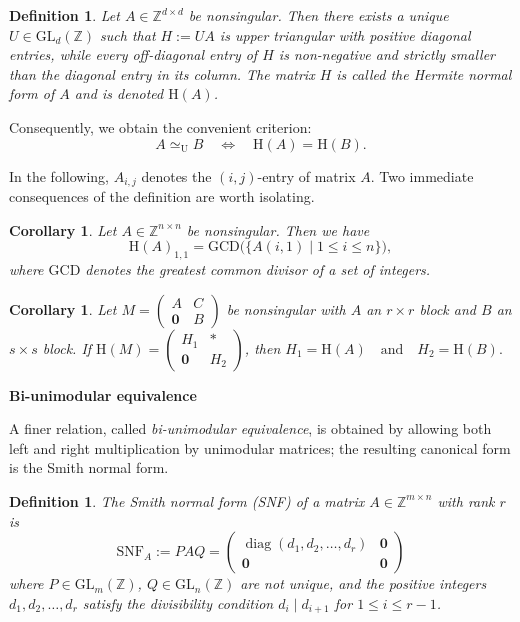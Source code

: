 \documentclass[reqno, 12pt]{article}
\newtheorem{cor}[thm]{Corollary}
\theoremstyle{mydefinition}
\newtheorem{dfn}[thm]{Definition}
\theoremstyle{myremark}
\numberwithin{algorithm}{section}
\def\Z{\mathbb{Z}}
\newcommand{\h}{{\mathrm{H}}}
\begin{document}
\begin{dfn}
Let $A\in \Z^{d \times d}$ be nonsingular.  Then there exists a unique $U \in\mathrm{GL}_d(\Z)$ such that $H:=UA$ is upper triangular with positive diagonal entries, while every off-diagonal entry of $H$ is non-negative and strictly smaller than the diagonal entry in its column.  The matrix $H$ is called the \emph{Hermite normal form} of $A$ and is denoted $\h(A)$.
\end{dfn}

Consequently, we obtain the convenient criterion:
\[
A \simeq_{\mathrm{U}} B \quad\iff\quad \h(A)=\h(B).
\]



In the following,  \( A_{i,j} \) denotes the \((i,j)\)-entry of matrix \( A \). Two immediate consequences of the definition are worth isolating.

\begin{cor}\label{cor-first-col-gcd}
Let $A\in\Z^{n\times n}$ be nonsingular.  Then we have
$$
\h(A)_{1,1} = \mathrm{GCD}\bigl( \{ A(i,1) \mid 1 \le i \le n \} \bigr),
$$
where $\mathrm{GCD}$ denotes the greatest common divisor of a set of integers.
\end{cor}

\begin{cor}\label{cor-block-HNF}
Let $M = \begin{pmatrix} A & C \\ \mathbf{0} & B \end{pmatrix}$ be nonsingular with $A$ an $r\times r$ block and $B$ an $s\times s$ block.  If $\h(M) = \begin{pmatrix} H_1 & * \\ \mathbf{0} & H_2 \end{pmatrix}$, then
$
H_1 = \h(A) \quad\text{and}\quad H_2 = \h(B).
$
\end{cor}

\def\diag{\mathop{\mathrm{diag}}}

\medskip
\noindent\textbf{Bi-unimodular equivalence}

A finer relation, called \emph{bi-unimodular equivalence}, is obtained by allowing both left and right multiplication by unimodular matrices; the resulting canonical form is the Smith normal form.
\begin{dfn}
The \emph{Smith normal form (SNF)} of a matrix $A \in \mathbb{Z}^{m \times n}$ with rank $r$ is
\[
\mathrm{SNF}_A := P A Q = \begin{pmatrix}
          \diag(d_1,d_2,\dots,d_r) &  \mathbf 0  \\
          \mathbf 0 &  \mathbf 0
        \end{pmatrix}
\]
where $P \in \mathrm{GL}_m(\mathbb{Z})$, $Q \in \mathrm{GL}_n(\mathbb{Z})$ are not unique, and the positive integers $d_1, d_2, \ldots, d_r$ satisfy the divisibility condition $d_i \mid d_{i+1}$ for $1 \leq i \leq r-1$.
\end{dfn}
\end{document}
